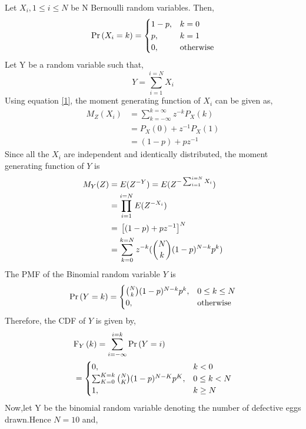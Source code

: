 \documentclass[journal,12pt,two column]{IEEEtran}
\begin{document}
\solution
Let $X_{i}, 1 \leq i \leq N$ be N Bernoulli random variables.  Then,
\begin{align}   
\Pr\left(X_i = k\right) = 
\begin{cases}
1 - p, & k = 0 \\
p, & k = 1 \\
0, & \textrm{otherwise}
\end{cases}
\label{1}
\end{align}
Let Y be a random variable such that,
\begin{equation}
    Y = \sum_{i = 1}^{i = N}X_i 
\end{equation}
Using equation \eqref{1}, the moment generating function of $X_{i}$ can be given as,
\begin{align}
    M_Z(X_i) &= \sum_{k = -\infty}^{k = \infty}z^{-k}P_X(k) \\
             &= P_X(0) + z^{-1}P_X(1) \\
             &= (1 - p) + pz^{-1}
\end{align}
Since all the $X_i$ are independent and identically distributed, the moment generating function of $Y$ is
\begin{align}
M_Y(Z) &= E(Z^{-Y}) = E(Z^{-\sum_{i = 1}^{i = N}X_i}) \\
       &= \prod_{i = 1}^{i = N}E(Z^{-X_i}) \\
       &= {}\left[(1 - p) + pz^{-1}\right]^N \\
       &= \sum_{k = 0}^{k = N}z^{-k}(\binom{N}{k}(1 - p)^{N - k}p^k)
\end{align}
The PMF of the Binomial random variable $Y$ is
\begin{align}
\Pr\left(Y = k\right) = 
\begin{cases}
\binom{N}{k}(1 - p)^{N - k}p^k, & 0 \leq k \leq N \\
0, & \textrm{otherwise}
\end{cases}
\label{pmf-Y}
\end{align}
Therefore, the CDF of $Y$ is given by,
\begin{align}
&\text{F}_{Y}\left(k\right) = \sum_{i = -\infty}^{i = k}\Pr\left(Y = i\right) \nonumber\\
&=\begin{cases}
0, & k < 0 \\
\sum_{K = 0}^{K = k}\binom{N}{K}(1 - p)^{N - K}p^K, & 0 \leq k < N \\
1, & k \geq N
\end{cases}
\label{cdf-Y}
\end{align}
Now,let Y be the binomial random variable denoting the number of defective eggs drawn.Hence $N = 10$ and,
\end{document}
